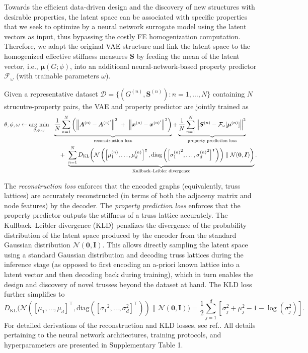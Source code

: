 \documentclass[fleqn,10pt]{wlscirep}
\newcommand{\boldface}[1]{\boldsymbol{#1}}
\newcommand{\bfx}{\boldface{x}}
\newcommand{\bfA}{\boldface{A}}
\newcommand{\bfI}{\boldface{I}}
\newcommand{\bfS}{\boldface{S}}
\newcommand{\bfmu}{\boldsymbol{\mu}}
\newcommand{\calD}{\mathcal{D}}
\newcommand{\calF}{\mathcal{F}}
\newcommand{\calN}{\mathcal{N}}
\newcommand{\be}{\begin{equation}}
\newcommand{\ee}{\end{equation}}
\newcommand{\argminWithArgs}{\operatornamewithlimits{arg\ min}}
\begin{document}
Towards the efficient data-driven design and the discovery of new structures with desirable properties, the latent space  can be associated with specific properties that we seek to optimize by a neural network surrogate model using the latent vectors as input, thus bypassing the costly FE homogenization computation. Therefore, we adapt the original VAE structure and link the latent space to the homogenized effective stiffness measures $\bfS$ by feeding the mean of the latent vector, i.e., $\bfmu(G;\phi)$, into an additional neural-network-based property predictor  $\mathcal{F}_{\omega}$ (with trainable parameters $\omega$).

Given a representative dataset $\calD = \{(G^{(n)},\bfS^{(n)}):n=1,\dots,N\}$ containing $N$ strucutre-property pairs, the VAE and property predictor are jointly trained as
\be\label{eq:total-loss}
\begin{aligned}
\theta,\phi,\omega \leftarrow \argminWithArgs_{\theta,\phi,\omega} \ \ 
&  
\underbrace{
\frac{1}{N}\sum_{n=1}^N \left(\left\|\bfA^\text{(n)} - \bfA^{\text{(n)}'} \right\|^2  
\ +\  
\left\|\bfx^\text{(n)} - \bfx^{\text{(n)}'} \right\|^2 \right) 
}_\text{reconstruction loss}
 + 
\underbrace{
 \frac{1}{N}\sum_{n=1}^N \left\|\bfS^{(n)} - \calF_\omega[\bfmu^{(n)}] \right\|^2  
 }_\text{property prediction loss}\\
 &
\quad +\ 
\underbrace{
\sum_{n=1}^N D_\text{KL}\bigg(\calN\left(\left[\mu_1^{(n)},\dots,\mu_d^{(n)}\right]^\intercal,\text{diag}\left(\left[{\sigma_1^{(n)}}^2,\dots,{\sigma_d^{(n)}}^2\right]^\intercal\right)\right) \parallel \calN(\boldsymbol{0},\bfI) \bigg)
}_\text{Kullback–Leibler divergence}. \\
\end{aligned}
\ee

The \textit{reconstruction loss} enforces that the encoded graphs (equivalently, truss lattices) are accurately reconstructed (in terms of both the adjaceny matrix and node features) by the decoder. The \textit{property prediction loss} enforces that the property predictor outputs the stiffness of a truss lattice accurately. The Kullback–Leibler divergence (KLD) \cite{kingma2013auto} penalizes the divergence of the probability distribution of the latent space produced by the encoder from the standard Gaussian distribution $\calN(\boldsymbol{0},\bfI)$. This allows directly sampling the latent space using a standard Gaussian distribution and decoding truss lattices 
during the inference stage (as opposed to first encoding an a-priori known lattice into a latent vector and then decoding back during training), which in turn enables the design and discovery of novel trusses beyond the dataset at hand. The KLD loss further simplifies to 
\be
D_\text{KL}\bigg(\calN\left(\left[\mu_1,\dots,\mu_d\right]^\intercal,\text{diag}\left(\left[{\sigma_1}^2,\dots,{\sigma_d^2}\right]^\intercal\right)\right) \parallel \calN(\boldsymbol{0},\bfI) \bigg) = \frac{1}{2}\sum_{j=1}^d \left[\sigma_j^2 + \mu_j^2 - 1 - \log\left(\sigma_j^2\right)\right].
\ee
For detailed derivations of the reconstruction and KLD losses, see ref.\cite{kingma2013auto}. All details pertaining to the neural network architectures, training protocols, and hyperparameters are presented in Supplementary Table 1.
\end{document}
